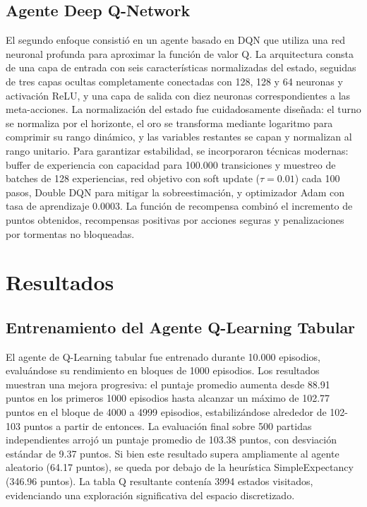 \documentclass[12pt,a4paper]{article}
\begin{document}
\subsection{Agente Deep Q-Network}

El segundo enfoque consistió en un agente basado en DQN que utiliza una red neuronal profunda para aproximar la función de valor Q. La arquitectura consta de una capa de entrada con seis características normalizadas del estado, seguidas de tres capas ocultas completamente conectadas con 128, 128 y 64 neuronas y activación ReLU, y una capa de salida con diez neuronas correspondientes a las meta-acciones. La normalización del estado fue cuidadosamente diseñada: el turno se normaliza por el horizonte, el oro se transforma mediante logaritmo para comprimir su rango dinámico, y las variables restantes se capan y normalizan al rango unitario. Para garantizar estabilidad, se incorporaron técnicas modernas: buffer de experiencia con capacidad para 100.000 transiciones y muestreo de batches de 128 experiencias, red objetivo con soft update ($\tau = 0.01$) cada 100 pasos, Double DQN para mitigar la sobreestimación, y optimizador Adam con tasa de aprendizaje 0.0003. La función de recompensa combinó el incremento de puntos obtenidos, recompensas positivas por acciones seguras y penalizaciones por tormentas no bloqueadas.

\section{Resultados}

\subsection{Entrenamiento del Agente Q-Learning Tabular}

El agente de Q-Learning tabular fue entrenado durante 10.000 episodios, evaluándose su rendimiento en bloques de 1000 episodios. Los resultados muestran una mejora progresiva: el puntaje promedio aumenta desde 88.91 puntos en los primeros 1000 episodios hasta alcanzar un máximo de 102.77 puntos en el bloque de 4000 a 4999 episodios, estabilizándose alrededor de 102-103 puntos a partir de entonces. La evaluación final sobre 500 partidas independientes arrojó un puntaje promedio de 103.38 puntos, con desviación estándar de 9.37 puntos. Si bien este resultado supera ampliamente al agente aleatorio (64.17 puntos), se queda por debajo de la heurística SimpleExpectancy (346.96 puntos). La tabla Q resultante contenía 3994 estados visitados, evidenciando una exploración significativa del espacio discretizado.
\end{document}
